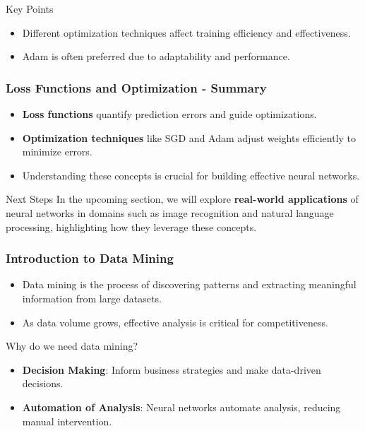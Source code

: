 \documentclass[aspectratio=169]{beamer}
\begin{document}
\begin{frame}[fragile]
    \begin{block}{Key Points}
        \begin{itemize}
            \item Different optimization techniques affect training efficiency and effectiveness.
            \item Adam is often preferred due to adaptability and performance.
        \end{itemize}
    \end{block}
\end{frame}

\begin{frame}[fragile]
    \frametitle{Loss Functions and Optimization - Summary}
    
    \begin{itemize}
        \item \textbf{Loss functions} quantify prediction errors and guide optimizations.
        \item \textbf{Optimization techniques} like SGD and Adam adjust weights efficiently to minimize errors.
        \item Understanding these concepts is crucial for building effective neural networks.
    \end{itemize}
    
    \begin{block}{Next Steps}
        In the upcoming section, we will explore \textbf{real-world applications} of neural networks in domains such as image recognition and natural language processing, highlighting how they leverage these concepts.
    \end{block}
\end{frame}

\begin{frame}[fragile]
    \frametitle{Introduction to Data Mining}
    \begin{itemize}
        \item Data mining is the process of discovering patterns and extracting meaningful information from large datasets.
        \item As data volume grows, effective analysis is critical for competitiveness.
    \end{itemize}
    
    \begin{block}{Why do we need data mining?}
        \begin{itemize}
            \item \textbf{Decision Making}: Inform business strategies and make data-driven decisions.
            \item \textbf{Automation of Analysis}: Neural networks automate analysis, reducing manual intervention.
        \end{itemize}
    \end{block}
\end{frame}
\end{document}
